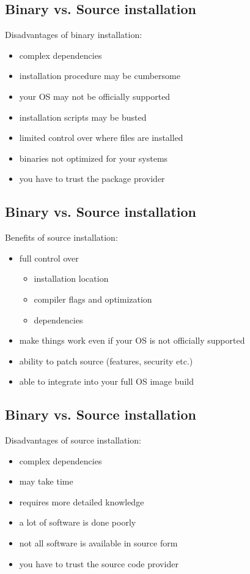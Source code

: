 \documentclass[xga]{xdvislides}
\begin{document}
\subsection{Binary vs. Source installation}
Disadvantages of binary installation:
\begin{itemize}
	\item complex dependencies
	\item installation procedure may be cumbersome
	\item your OS may not be officially supported
	\item installation scripts may be busted
	\item limited control over where files are installed
	\item binaries not optimized for your systems
	\item you have to trust the package provider
\end{itemize}

\subsection{Binary vs. Source installation}
Benefits of source installation:
\begin{itemize}
	\item full control over
		\begin{itemize}
			\item installation location
			\item compiler flags and optimization
			\item dependencies
		\end{itemize}
	\item make things work even if your OS is not officially supported
	\item ability to patch source (features, security etc.)
	\item able to integrate into your full OS image build
\end{itemize}

\subsection{Binary vs. Source installation}
Disadvantages of source installation:
\begin{itemize}
	\item complex dependencies
	\item may take time
	\item requires more detailed knowledge
	\item a lot of software is done poorly
	\item not all software is available in source form
	\item you have to trust the source code provider
\end{itemize}
\end{document}
